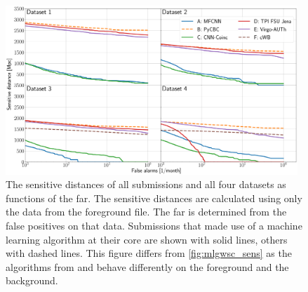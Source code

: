 \begin{figure}
    \centering
    \includegraphics[width=0.98\textwidth]{chapters/mdc/images/sens_fg.pdf}
    \caption[Sensitive distance calculated on foreground]{The sensitive distances of all submissions and all four datasets as functions of the \acrshort{far}. The sensitive distances are calculated using only the data from the foreground file. The \acrshort{far} is determined from the false positives on that data. Submissions that made use of a machine learning algorithm at their core are shown with solid lines, others with dashed lines. This figure differs from \autoref{fig:mlgwsc_sens} as the algorithms from \mfcnn and \cnn behave differently on the foreground and the background.}
    \label{fig:sens_fg}
\end{figure}

